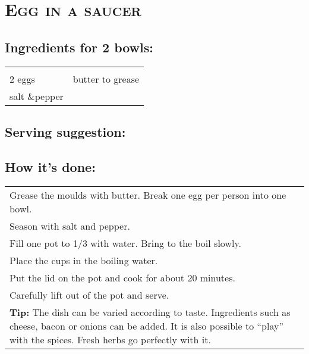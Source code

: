 \section{\textsc{Egg in a saucer}}

\subsection*{Ingredients for 2 bowls:}

\begin{tabular}{p{7.5cm} p{7.5cm}}
	& \\
	2 eggs & butter to grease \\
	salt \&pepper &
\end{tabular}

\subsection*{Serving suggestion:}


\subsection*{How it's done:}

\begin{tabular}{p{15cm}}
	\\
  Grease the moulds with butter. Break one egg per person into one bowl.\\
  Season with salt and pepper.\\
  Fill one pot to 1/3 with water. Bring to the boil slowly.\\
  Place the cups in the boiling water.\\
  Put the lid on the pot and cook for about 20 minutes.\\
  Carefully lift out of the pot and serve.\\
  \vspace{0.5cm}
  \textbf{Tip:} The dish can be varied according to taste. Ingredients such as cheese, bacon or onions can be added. It is also possible to “play” with the spices. Fresh herbs go perfectly with it.
\end{tabular}
